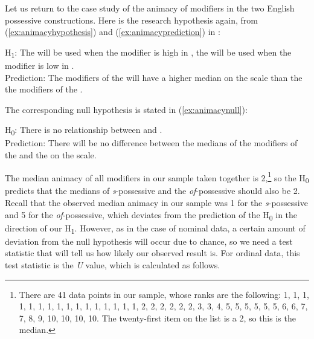 Let us return to the case study of the animacy  of modifiers in the two English possessive  constructions. Here is the research hypothesis again, from (\ref{ex:animacyhypothesis}) and (\ref{ex:animacyprediction}) in :

\begin{exe}
\ex H\textsubscript{1}: The  will be used when the modifier is high in ,  the  will be used when the modifier is low in .\smallskip\\
Prediction: The modifiers of the   will have a higher median  on the  scale than the the modifiers of the .
\label{ex:animacyalternative}
\end{exe}

The corresponding null hypothesis  is stated in  (\ref{ex:animacynull}):

\begin{exe}
\ex H\textsubscript{0}: There is no relationship between  and .\smallskip\\
Prediction: There will be no difference between the medians  of the modifiers of the  and the  on the  scale.
\label{ex:animacynull}
\end{exe}

The median  animacy  of all modifiers in our sample taken together is 2,\footnote{There are 41 data points in our sample, whose ranks are the following: 1, 1, 1, 1, 1, 1, 1, 1, 1, 1, 1, 1, 1, 1, 1, 1, 2, 2, 2, 2, 2, 2, 3, 3, 4, 5, 5, 5, 5, 5, 5, 6, 6, 7, 7, 8, 9, 10, 10, 10, 10. The twenty\hyp{}first item on the list is a 2, so this is the median.} so the H\textsubscript{0} predicts that the medians  of \textit{s}-possessive  and the \textit{of}-possessive should also be 2. Recall that the observed median animacy in our sample was 1 for the \textit{s}-possessive and 5 for the \textit{of}-possessive, which deviates from the prediction of the H\textsubscript{0} in the direction of our H\textsubscript{1}. However, as in the case of nominal  data, a certain amount of deviation from the null hypothesis  will occur due to chance,  so we need a test statistic that will tell us how likely our observed result is. For ordinal  data, this test statistic is the \textit{U} value, which is calculated as follows.

